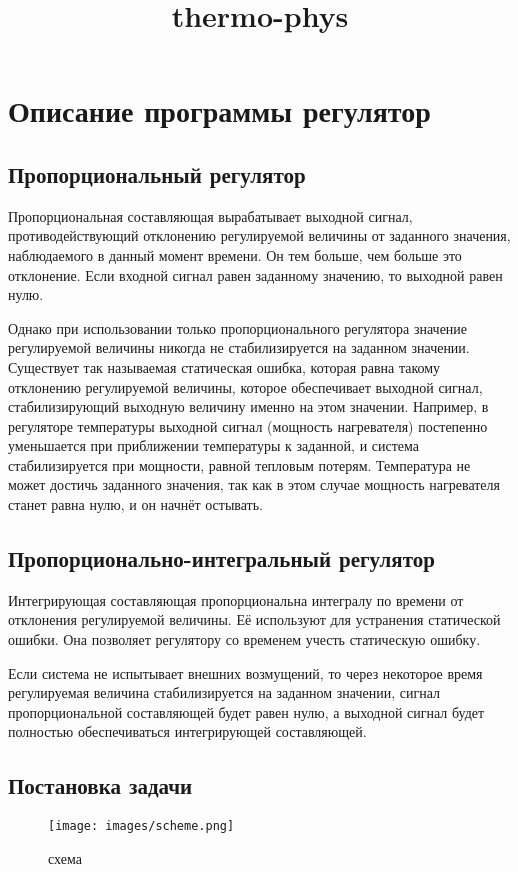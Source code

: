 \documentclass{article}
\title{thermo-phys}
\begin{document}
\section{Описание программы регулятор}

\subsection{Пропорциональный регулятор}
Пропорциональная составляющая вырабатывает выходной сигнал, противодействующий отклонению регулируемой величины от заданного значения, наблюдаемого в данный момент времени. Он тем больше, чем больше это отклонение. Если входной сигнал равен заданному значению, то выходной равен нулю.

Однако при использовании только пропорционального регулятора значение регулируемой величины никогда не стабилизируется на заданном значении. Существует так называемая статическая ошибка, которая равна такому отклонению регулируемой величины, которое обеспечивает выходной сигнал, стабилизирующий выходную величину именно на этом значении. Например, в регуляторе температуры выходной сигнал (мощность нагревателя) постепенно уменьшается при приближении температуры к заданной, и система стабилизируется при мощности, равной тепловым потерям. Температура не может достичь заданного значения, так как в этом случае мощность нагревателя станет равна нулю, и он начнёт остывать.

\subsection{Пропорционально-интегральный регулятор}
Интегрирующая составляющая пропорциональна интегралу по времени от отклонения регулируемой величины. Её используют для устранения статической ошибки. Она позволяет регулятору со временем учесть статическую ошибку.

Если система не испытывает внешних возмущений, то через некоторое время регулируемая величина стабилизируется на заданном значении, сигнал пропорциональной составляющей будет равен нулю, а выходной сигнал будет полностью обеспечиваться интегрирующей составляющей.

\subsection{Постановка задачи}

\begin{figure}[H]
    \centering
    \texttt{[image: images/scheme.png]}
    \caption{схема}
    \label{fig:scheme}
\end{figure}
\end{document}
